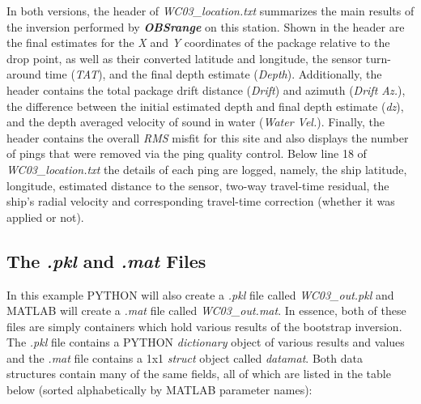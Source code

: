 \documentclass[titlepage]{article}
\begin{document}
  In both versions, the header of \textit{WC03\_location.txt} summarizes the main results of the inversion performed by \textbf{\textit{OBSrange}} on this station. Shown in the header are the final estimates for the \textit{X} and \textit{Y} coordinates of the package relative to the drop point, as well as their converted latitude and longitude, the sensor turn-around time (\textit{TAT}), and the final depth estimate (\textit{Depth}). Additionally, the header contains the total package drift distance (\textit{Drift}) and azimuth (\textit{Drift Az.}), the difference between the initial estimated depth and final depth estimate (\textit{dz}), and the depth averaged velocity of sound in water (\textit{Water Vel.}). Finally, the header contains the overall \textit{RMS} misfit for this site and also displays the number of pings that were removed via the ping quality control. Below line 18 of \textit{WC03\_location.txt} the details of each ping are logged, namely, the ship latitude, longitude, estimated distance to the sensor, two-way travel-time residual, the ship’s radial velocity and corresponding travel-time correction (whether it was applied or not).
 
  \subsection{The \textit{.pkl} and \textit{.mat} Files}
  In this example PYTHON will also create a \textit{.pkl} file called \textit{WC03\_out.pkl} and MATLAB will create a \textit{.mat} file called \textit{WC03\_out.mat}. In essence, both of these files are simply containers which hold various results of the bootstrap inversion. The \textit{.pkl} file contains a PYTHON \textit{dictionary} object of various results and values and the \textit{.mat} file contains a 1x1 \textit{struct} object called \textit{datamat}. Both data structures contain many of the same fields, all of which are listed in the table below (sorted alphabetically by MATLAB parameter names):
\end{document}
